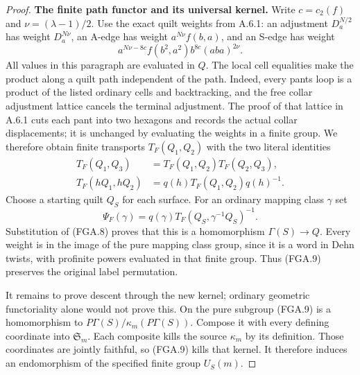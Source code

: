 \begin{proof}
\par\medskip\noindent\textbf{The finite path functor and its universal kernel.}\quad
Write $c=c_2(f)$ and $\nu=(\lambda-1)/2$.
Use the exact quilt weights from A.6.1:
an adjustment $D_a^{N/2}$ has weight $D_a^{N\nu}$,
an A-edge has weight $a^{N\nu}f(b,a)$, and an S-edge
has weight
\[
             a^{N\nu-8c}f(b^2,a^2)b^{8c}(aba)^{2\nu}.
                                                               \tag{FGA.7}
\]
All values in this paragraph are evaluated in $Q$.
The local cell equalities make the product along a
quilt path independent of the path.  Indeed, every
pants loop is a product of the listed ordinary
cells and backtracking, and the free collar
adjustment lattice cancels the terminal adjustment.
The proof of that lattice in A.6.1 cuts each pant
into two hexagons and records the actual collar
displacements; it is unchanged by evaluating the
weights in a finite group.
We therefore obtain finite transports $T_F(Q_1,Q_2)$
with the two literal identities
\[
 \begin{aligned}
 T_F(Q_1,Q_3)&=T_F(Q_1,Q_2)T_F(Q_2,Q_3),\\
 T_F(hQ_1,hQ_2)&=q(h)T_F(Q_1,Q_2)q(h)^{-1}.
 \end{aligned}
                                                               \tag{FGA.8}
\]
Choose a starting quilt $Q_S$ for each surface.
For an ordinary mapping class $\gamma$ set
\[
       \Psi_F(\gamma)=q(\gamma)
                     T_F(Q_S,\gamma^{-1}Q_S)^{-1}.
                                                               \tag{FGA.9}
\]
Substitution of (FGA.8) proves that this is a
homomorphism $\Gamma(S)\to Q$.  Every weight is in
the image of the pure mapping class group, since
it is a word in Dehn twists, with profinite powers
evaluated in that finite group.  Thus (FGA.9)
preserves the original label permutation.

It remains to prove descent through the new kernel;
ordinary geometric functoriality alone would not
prove this.  On the pure subgroup (FGA.9) is a
homomorphism to $P\Gamma(S)/\kappa_m(P\Gamma(S))$.
Compose it with every defining coordinate into
$\mathfrak S_m$.  Each composite kills the source
$\kappa_m$ by its definition.  Those coordinates
are jointly faithful, so (FGA.9) kills that kernel.
It therefore induces an endomorphism of the
specified finite group $U_S(m)$.


\end{proof}
